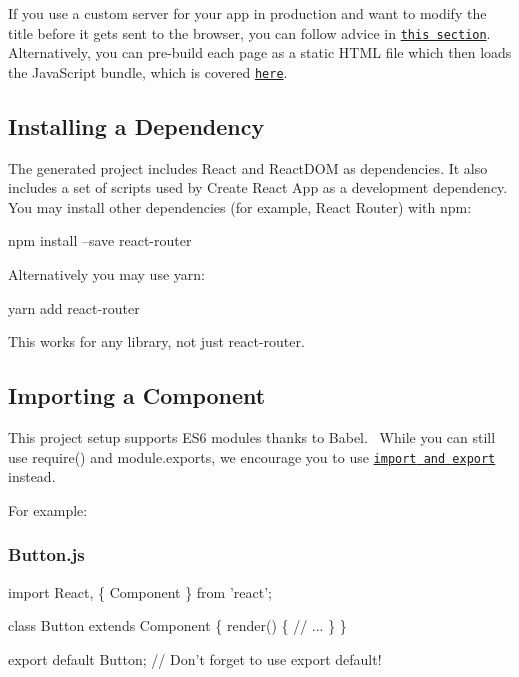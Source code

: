 If you use a custom server for your app in production and want to modify the title before it gets sent to the browser, you can follow advice in \href{#generating-dynamic-meta-tags-on-the-server}{\tt this section}. Alternatively, you can pre-\/build each page as a static H\+T\+ML file which then loads the Java\+Script bundle, which is covered \href{#pre-rendering-into-static-html-files}{\tt here}.

\subsection*{Installing a Dependency}

The generated project includes React and React\+D\+OM as dependencies. It also includes a set of scripts used by Create React App as a development dependency. You may install other dependencies (for example, React Router) with {\ttfamily npm}\+:


\begin{DoxyCode}
npm install --save react-router
\end{DoxyCode}


Alternatively you may use {\ttfamily yarn}\+:


\begin{DoxyCode}
yarn add react-router
\end{DoxyCode}


This works for any library, not just {\ttfamily react-\/router}.

\subsection*{Importing a Component}

This project setup supports E\+S6 modules thanks to Babel.~\newline
 While you can still use {\ttfamily require()} and {\ttfamily module.\+exports}, we encourage you to use \href{http://exploringjs.com/es6/ch_modules.html}{\tt {\ttfamily import} and {\ttfamily export}} instead.

For example\+:

\subsubsection*{{\ttfamily Button.\+js}}


\begin{DoxyCode}
import React, \{ Component \} from 'react';

class Button extends Component \{
  render() \{
    // ...
  \}
\}

export default Button; // Don’t forget to use export default!
\end{DoxyCode}


